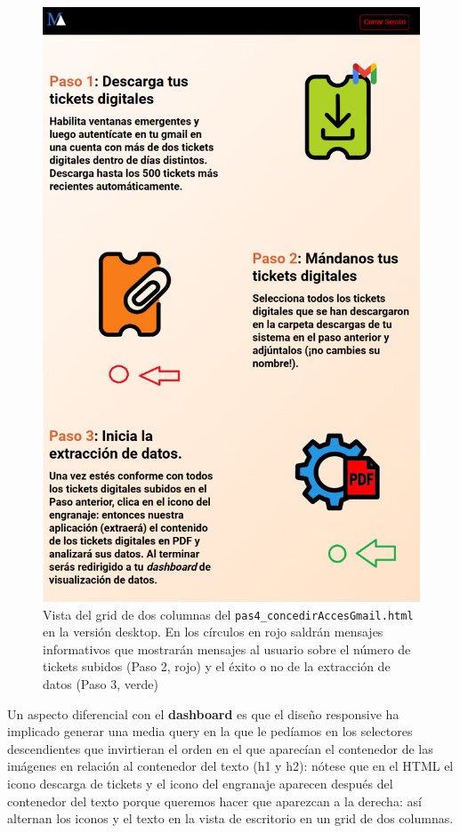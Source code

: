 \documentclass[a4paper,12pt]{report}
\begin{document}
	\FloatBarrier
	\begin{figure}[H]
		\centering
		\caption{Vista del grid de dos columnas del \texttt{pas4\_concedirAccesGmail.html} en la versión desktop. En los círculos en rojo saldrán mensajes informativos que mostrarán mensajes al usuario sobre el número de tickets subidos (Paso 2, rojo) y el éxito o no de la extracción de datos (Paso 3, verde)}
		\includegraphics[width=.95\linewidth]{img/pas4Grid2cols}

		\label{fig:pas4grid2cols}
	\end{figure}
	\FloatBarrier
	
	Un aspecto diferencial con el \textbf{dashboard} es que el diseño responsive ha implicado generar una media query en la que le pedíamos en los selectores descendientes que invirtieran el orden en el que aparecían el contenedor de las imágenes en relación al contenedor del texto (h1 y h2): nótese que en el HTML el icono descarga de tickets y el icono del engranaje aparecen después del contenedor del texto porque queremos hacer que aparezcan a la derecha: así alternan los iconos y el texto en la vista de escritorio en un grid de dos columnas. 
	
\end{document}
